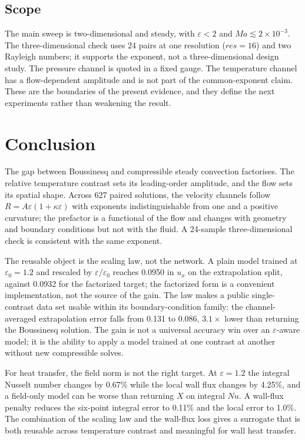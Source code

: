 \documentclass[preprint,11pt,a4paper,times,doubleblind]{elsarticle}
\begin{document}
\subsection{Scope}

The main sweep is two-dimensional and steady, with $\varepsilon<2$ and
$Ma\lesssim2\times10^{-3}$. The three-dimensional check uses 24 pairs at one resolution
($res=16$) and two Rayleigh numbers; it supports the exponent, not a three-dimensional design
study. The pressure channel is quoted in a fixed gauge. The temperature channel has a
flow-dependent amplitude and is not part of the common-exponent claim. These are the boundaries
of the present evidence, and they define the next experiments rather than weakening the
result.

\section{Conclusion}

The gap between Boussinesq and compressible steady convection factorises. The relative
temperature contrast sets its leading-order amplitude, and the flow sets its spatial shape.
Across 627 paired solutions, the velocity channels follow $R=A\varepsilon(1+\kappa\varepsilon)$
with exponents indistinguishable from one and a positive curvature; the prefactor is a
functional of the flow and changes with geometry and boundary conditions but not with the
fluid. A 24-sample three-dimensional check is consistent with the same exponent.

The reusable object is the scaling law, not the network. A plain model trained at
$\varepsilon_0=1.2$ and rescaled by $\varepsilon/\varepsilon_0$ reaches 0.0950 in $u_x$ on the
extrapolation split, against 0.0932 for the factorized target; the factorized form is a
convenient implementation, not the source of the gain. The law makes a public single-contrast
data set usable within its boundary-condition family: the channel-averaged extrapolation error
falls from 0.131 to 0.086, $3.1\times$ lower than returning the Boussinesq solution. The gain
is not a universal accuracy win over an $\varepsilon$-aware model; it is the ability to apply a
model trained at one contrast at another without new compressible solves.

For heat transfer, the field norm is not the right target. At $\varepsilon=1.2$ the integral
Nusselt number changes by 0.67\% while the local wall flux changes by 4.25\%, and a field-only
model can be worse than returning $X$ on integral $Nu$. A wall-flux penalty reduces the
six-point integral error to 0.11\% and the local error to 1.0\%. The combination of the
scaling law and the wall-flux loss gives a surrogate that is both reusable across
temperature contrast and meaningful for wall heat transfer.
\end{document}
